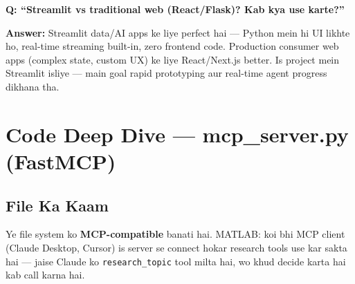 \documentclass[11pt, a4paper]{article}
\begin{document}
\begin{interviewbox}
\textbf{Q: ``Streamlit vs traditional web (React/Flask)? Kab kya use karte?''}

\textbf{Answer:} Streamlit data/AI apps ke liye perfect hai --- Python mein hi UI likhte ho, real-time streaming built-in, zero frontend code. Production consumer web apps (complex state, custom UX) ke liye React/Next.js better. Is project mein Streamlit isliye --- main goal rapid prototyping aur real-time agent progress dikhana tha.
\end{interviewbox}

\newpage

\section{Code Deep Dive --- mcp\_server.py (FastMCP)}

\subsection{File Ka Kaam}

\begin{storybox}
Ye file system ko \textbf{MCP-compatible} banati hai. MATLAB: koi bhi MCP client (Claude Desktop, Cursor) is server se connect hokar research tools use kar sakta hai --- jaise Claude ko \texttt{research\_topic} tool milta hai, wo khud decide karta hai kab call karna hai.
\end{storybox}
\end{document}
